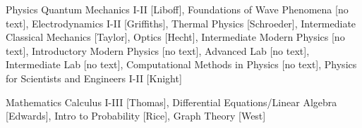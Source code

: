 


\begin{cvskills}


\cvskill
{Physics} %
{Quantum Mechanics I-II [Liboff], Foundations of Wave Phenomena [no text], Electrodynamics I-II [Griffiths], Thermal Physics [Schroeder], Intermediate Classical Mechanics [Taylor], Optics [Hecht], Intermediate Modern Physics [no text], Introductory Modern Physics [no text], Advanced Lab [no text], Intermediate Lab [no text], Computational Methods in Physics [no text], Physics for Scientists and Engineers I-II [Knight] } %


\cvskill
{Mathematics} %
{Calculus I-III [Thomas], Differential Equations/Linear Algebra [Edwards], Intro to Probability [Rice], Graph Theory [West]} %


\end{cvskills}